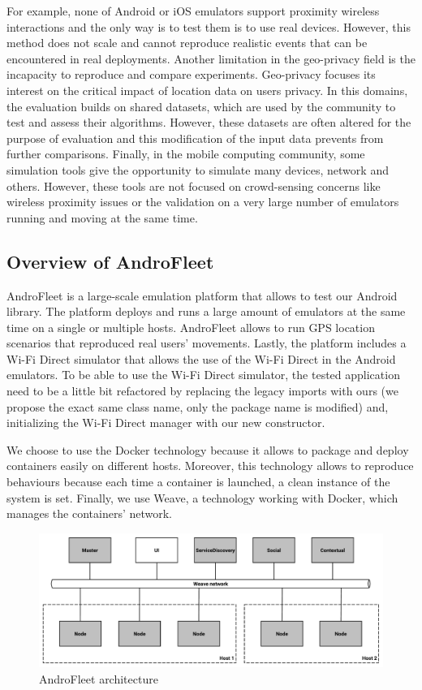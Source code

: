For example, none of Android or iOS emulators support proximity wireless interactions and the only
way is to test them is to use real devices.
However, this method does not scale and cannot reproduce realistic events that can be encountered in real deployments. 
Another limitation in the geo-privacy field is the incapacity to reproduce and compare experiments. Geo-privacy focuses its interest on the critical impact of location data on users privacy. 
In this domains, the evaluation builds on shared datasets, which are used by the community to test and assess their algorithms. 
However, these datasets are often altered for the purpose of evaluation and this modification of the input data prevents from further comparisons.
Finally, in the mobile computing community, some simulation tools give the opportunity to simulate many devices, network and others. 
However, these tools are not focused on crowd-sensing concerns like wireless proximity issues or the validation on a very large number of emulators running and moving at the same time.


\subsection{Overview of AndroFleet}

AndroFleet is a large-scale emulation platform that allows to test our Android library.
The platform deploys and runs a large amount of emulators at the same time on a single or multiple hosts.
AndroFleet allows to run GPS location scenarios that reproduced real users' movements.
Lastly, the platform includes a Wi-Fi Direct simulator that allows the use of the Wi-Fi Direct in the Android emulators.
To be able to use the Wi-Fi Direct simulator, the tested application need to be a little bit refactored by replacing the legacy imports with ours (we propose the exact same class name, only the package name is modified) and, initializing the Wi-Fi Direct manager with our new constructor.

We choose to use the Docker technology because it allows to package and deploy containers easily on different hosts.
Moreover, this technology allows to reproduce behaviours because each time a container is launched, a clean instance of the system is set.
Finally, we use Weave, a technology working with Docker, which manages the containers' network.

\begin{figure}[h]
    \centering
    \includegraphics[width=\textwidth]{figures/androfleet}
    \caption{\label{AndroFleet} AndroFleet architecture}
\end{figure}

